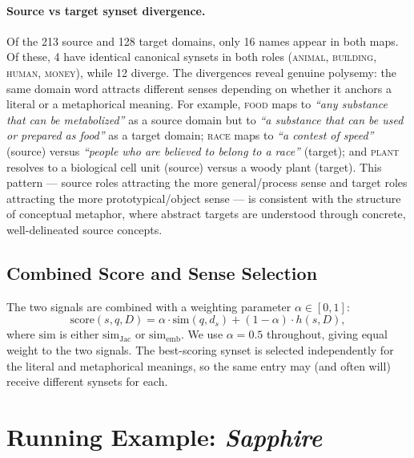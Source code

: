 \documentclass[11pt,a4paper]{article}
\begin{document}
\paragraph{Source vs target synset divergence.}
Of the 213 source and 128 target domains, only 16 names appear in both maps.
Of these, 4 have identical canonical synsets in both roles
(\textsc{animal}, \textsc{building}, \textsc{human}, \textsc{money}),
while 12 diverge.
The divergences reveal genuine polysemy: the same domain word attracts
different senses depending on whether it anchors a literal or a metaphorical
meaning.
For example, \textsc{food} maps to \textit{``any substance that can be metabolized''}
as a source domain but to \textit{``a substance that can be used or prepared as food''}
as a target domain; \textsc{race} maps to \textit{``a contest of speed''} (source)
versus \textit{``people who are believed to belong to a race''} (target);
and \textsc{plant} resolves to a biological cell unit (source) versus a woody
plant (target).
This pattern — source roles attracting the more general/process sense and
target roles attracting the more prototypical/object sense — is consistent with
the structure of conceptual metaphor, where abstract targets are understood
through concrete, well-delineated source concepts.

\subsection{Combined Score and Sense Selection}
\label{subsec:combined}

The two signals are combined with a weighting parameter $\alpha \in [0,1]$:
\begin{equation}
  \mathrm{score}(s, q, D)
    = \alpha \cdot \mathrm{sim}(q, d_s)
    + (1 - \alpha) \cdot h(s, D),
\end{equation}
where $\mathrm{sim}$ is either $\mathrm{sim}_{\mathrm{Jac}}$ or
$\mathrm{sim}_{\mathrm{emb}}$.
We use $\alpha = 0.5$ throughout, giving equal weight to the two signals.
The best-scoring synset is selected independently for the literal and
metaphorical meanings, so the same entry may (and often will) receive
different synsets for each.

\section{Running Example: \emph{Sapphire}}
\label{sec:example}
\end{document}
